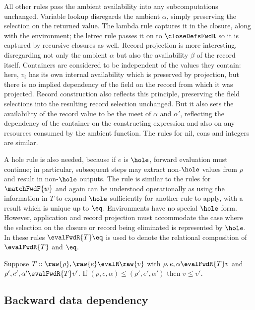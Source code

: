  All other rules pass the ambient availability into any subcomputations unchanged. Variable lookup disregards the ambient $\alpha$, simply preserving the selection on the returned value. The lambda rule captures it in the closure, along with the environment; the letrec rule passes it on to $\closeDefsFwdR$ so it is captured by recursive closures as well. Record projection is more interesting, disregarding not only the ambient $\alpha$ but also the availability $\beta$ of the record itself. Containers are considered to be independent of the values they contain: here, $v_i$ has its own internal availability which is preserved by projection, but there is no implied dependency of the field on the record from which it was projected. Record construction also reflects this principle, preserving the field selections into the resulting record selection unchanged. But it also sets the availability of the record value to be the meet of $\alpha$ and $\alpha'$, reflecting the dependency of the container on the constructing expression and also on any resources consumed by the ambient function. The rules for nil, cons and integers are similar.

 A hole rule is also needed, because if $e$ is $\hole$, forward evaluation must continue; in particular, subsequent steps may extract non-$\hole$ values from $\rho$ and result in non-$\hole$ outputs. The rule is similar to the rules for $\matchFwdF{w}$ and again can be understood operationally as using the information in $T$ to expand $\hole$ sufficiently for another rule to apply, with a result which is unique up to $\eq$. Environments have no special $\hole$ form. However, application and record projection must accommodate the case where the selection on the closure or record being eliminated is represented by $\hole$. In these rules $\evalFwdR{T}\eq$ is used to denote the relational composition of $\evalFwdR{T}$ and $\eq$.

\begin{lemma}
   Suppose $T :: \raw{\rho}, \raw{e} \evalR \raw{v}$ with $\rho, e, \alpha \evalFwdR{T} v$ and $\rho', e', \alpha' \evalFwdR{T} v'$. If $(\rho, e, \alpha) \leq (\rho', e', \alpha')$ then $v \leq v'$.
\end{lemma}

\subsection{Backward data dependency}
\label{sec:data-dependencies:analyses:bwd}


